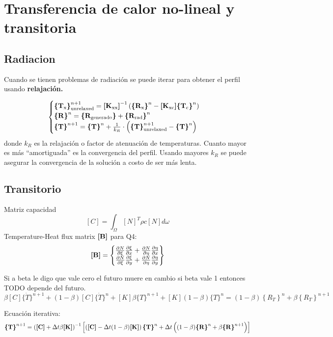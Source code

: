 \section{Transferencia de calor no-lineal y transitoria}

\subsection*{Radiacion}
Cuando se tienen problemas de radiación se puede iterar para obtener el perfil usando \textbf{relajación.}


\begin{equation}
\begin{cases}
\boldsymbol{\{ }\mathbf{T_{\mathrm{x}}} \boldsymbol{\}}^{n+1}_{\mathrm{unrelaxed}} =  \boldsymbol{[}\mathbf{K_{\mathrm{xx}}} \boldsymbol{]}^{-1}  \left(\boldsymbol{\{ }\mathbf{R_{\mathrm{x}}} \boldsymbol{\}}^{n} - \boldsymbol{[}\mathbf{K_{\mathrm{xc}}} \boldsymbol{]} \boldsymbol{\{ }\mathbf{T_{\mathrm{c}}} \boldsymbol{\}}^{n}\right)\\
\boldsymbol{\{ }\mathbf{R} \boldsymbol{\}}^{n} = \boldsymbol{\{ }\mathbf{R_{\mathrm{generado}}} \boldsymbol{\}}+ \boldsymbol{\{ }\mathbf{R_{\mathrm{rad}}} \boldsymbol{\}}^{n} \\
\boldsymbol{\{ }\mathbf{T} \boldsymbol{\}}^{n+1} = \boldsymbol{\{ }\mathbf{T} \boldsymbol{\}}^n + \frac{1}{k_R} \cdot \left( \boldsymbol{\{ }\mathbf{T} \boldsymbol{\}}^{n+1}_{\mathrm{unrelaxed}} - \boldsymbol{\{ }\mathbf{T} \boldsymbol{\}}^{n} \right)
\end{cases}
\end{equation}
donde $k_R$ es la relajación o factor de atenuación de temperaturas. Cuanto mayor es más ``amortiguada'' es la convergencia del perfil. Usando mayores $k_R$ se puede asegurar la convergencia de la solución a costo de ser más lenta.


\subsection*{Transitorio}
Matriz capacidad
\[
[C]=\int_{\Omega}[N]^{T} \rho c[N] d \omega
\]
Temperature-Heat flux matrix $\boldsymbol{[}\mathbf{B} \boldsymbol{]}$ para Q4:
\[
\boldsymbol{[}\mathbf{B} \boldsymbol{]} =
\begin{Bmatrix}
\frac{\partial N}{\partial \xi} \frac{\partial \xi}{\partial x} + \frac{\partial N}{\partial \eta} \frac{\partial \eta}{\partial x} \\
\frac{\partial N}{\partial \xi} \frac{\partial \xi}{\partial y} + \frac{\partial N}{\partial \eta} \frac{\partial \eta}{\partial y} 
\end{Bmatrix}
\]

Si a beta le digo que vale cero el futuro muere en cambio si beta vale 1 entonces TODO depende del futuro.
\[
\beta[C]\{\dot{T}\}^{n+1}+(1-\beta)[C]\{\dot{T}\}^{n}+[K] \beta\{T\}^{n+1}+[K](1-\beta)\{T\}^{n}=(1-\beta)\left\{R_{T}\right\}^{n}+\beta\left\{R_{T}\right\}^{n+1}
\]

Ecuación iterativa:
\begin{equation}
\boldsymbol{\{ }\mathbf{T} \boldsymbol{\}}^{n+1} = \left( \boldsymbol{[}\mathbf{C} \boldsymbol{]} +\Delta t \beta \boldsymbol{[}\mathbf{K} \boldsymbol{]} \right)^{-1} \left[ \left(\boldsymbol{[}\mathbf{C} \boldsymbol{]} -\Delta t(1-\beta) \boldsymbol{[}\mathbf{K} \boldsymbol{]}\right) \boldsymbol{\{ }\mathbf{T} \boldsymbol{\}}^n +\Delta t \left( (1-\beta) \boldsymbol{\{ }\mathbf{R} \boldsymbol{\}}^n + \beta \boldsymbol{\{ }\mathbf{R} \boldsymbol{\}}^{n+1}  \right)\right]
\end{equation}



